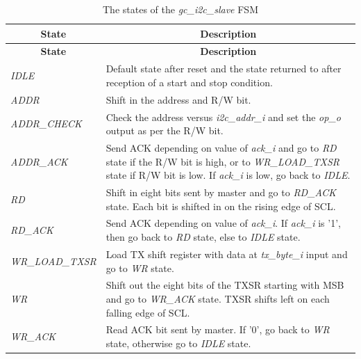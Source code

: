 \documentclass[a4paper,11pt]{article}
\begin{document}
\begin{longtable}{l p{}}
  \caption{The states of the \textit{gc\_i2c\_slave} FSM}
  \label{tbl:fsm} \\

    \hline
    \multicolumn{1}{c}{\textbf{State}} & \multicolumn{1}{c}{\textbf{Description}} \\
    \hline
    \endfirsthead
    
    \hline
    \multicolumn{1}{c}{\textbf{State}} & \multicolumn{1}{c}{\textbf{Description}} \\
    \hline
    \endhead
    
    \hline
    \endfoot
    
    \textit{IDLE} & Default state after reset and the state returned to after
                    reception of a start and stop condition. \\
    \textit{ADDR} & Shift in the address and R/W bit. \\
    \textit{ADDR\_CHECK} & Check the address versus \textit{i2c\_addr\_i} and set the \textit{op\_o}
                           output as per the R/W bit. \\
    \textit{ADDR\_ACK} & Send ACK depending on value of \textit{ack\_i} and go to \textit{RD} state
                         if the R/W bit is high, or to \textit{WR\_LOAD\_TXSR} state if R/W bit is low.
                         If \textit{ack\_i} is low, go back to \textit{IDLE}. \\
   \textit{RD} & Shift in eight bits sent by master and go to \textit{RD\_ACK} state. Each bit 
                 is shifted in on the rising edge of SCL. \\
    \textit{RD\_ACK} & Send ACK depending on value of \textit{ack\_i}. If \textit{ack\_i} is '1',
                       then go back to \textit{RD} state, else to \textit{IDLE} state. \\
    \textit{WR\_LOAD\_TXSR} & Load TX shift register with data at \textit{tx\_byte\_i} input
                              and go to \textit{WR} state. \\
    \textit{WR} & Shift out the eight bits of the TXSR starting with MSB and go to 
                  \textit{WR\_ACK} state. TXSR shifts left on each falling edge of SCL. \\
    \textit{WR\_ACK} & Read ACK bit sent by master. If '0', go back to \textit{WR} state, otherwise
                       go to \textit{IDLE} state. \\
\end{longtable}
\end{document}
